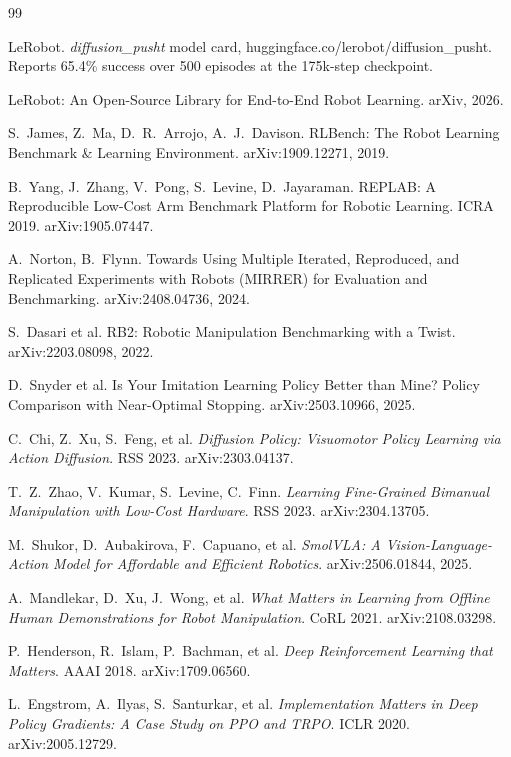 \documentclass[11pt]{article}
\begin{document}
\begin{thebibliography}{99}

LeRobot. \emph{diffusion\_pusht} model card, huggingface.co/lerobot/diffusion\_pusht.
Reports 65.4\% success over 500 episodes at the 175k-step checkpoint.

LeRobot: An Open-Source Library for End-to-End Robot Learning. arXiv, 2026.

S.~James, Z.~Ma, D.~R.~Arrojo, A.~J.~Davison.
RLBench: The Robot Learning Benchmark \& Learning Environment. arXiv:1909.12271, 2019.

B.~Yang, J.~Zhang, V.~Pong, S.~Levine, D.~Jayaraman.
REPLAB: A Reproducible Low-Cost Arm Benchmark Platform for Robotic Learning.
ICRA 2019. arXiv:1905.07447.

A.~Norton, B.~Flynn.
Towards Using Multiple Iterated, Reproduced, and Replicated Experiments with Robots
(MIRRER) for Evaluation and Benchmarking. arXiv:2408.04736, 2024.

S.~Dasari et al.
RB2: Robotic Manipulation Benchmarking with a Twist. arXiv:2203.08098, 2022.

D.~Snyder et al.
Is Your Imitation Learning Policy Better than Mine? Policy Comparison with
Near-Optimal Stopping. arXiv:2503.10966, 2025.

C.~Chi, Z.~Xu, S.~Feng, et al.
\emph{Diffusion Policy: Visuomotor Policy Learning via Action Diffusion}.
RSS 2023. arXiv:2303.04137.

T.~Z.~Zhao, V.~Kumar, S.~Levine, C.~Finn.
\emph{Learning Fine-Grained Bimanual Manipulation with Low-Cost Hardware}.
RSS 2023. arXiv:2304.13705.

M.~Shukor, D.~Aubakirova, F.~Capuano, et al.
\emph{SmolVLA: A Vision-Language-Action Model for Affordable and Efficient
Robotics}. arXiv:2506.01844, 2025.

A.~Mandlekar, D.~Xu, J.~Wong, et al.
\emph{What Matters in Learning from Offline Human Demonstrations for Robot
Manipulation}. CoRL 2021. arXiv:2108.03298.

P.~Henderson, R.~Islam, P.~Bachman, et al.
\emph{Deep Reinforcement Learning that Matters}. AAAI 2018. arXiv:1709.06560.

L.~Engstrom, A.~Ilyas, S.~Santurkar, et al.
\emph{Implementation Matters in Deep Policy Gradients: A Case Study on PPO and
TRPO}. ICLR 2020. arXiv:2005.12729.


\end{thebibliography}
\end{document}
